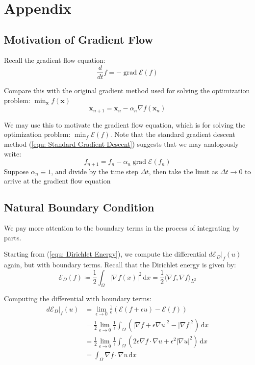 \documentclass[a4paper]{article}
\newcommand{\dx}{\, \text{d} x}
\theoremstyle{definition}
\DeclareMathOperator{\grad}{grad}
\begin{document}
\newpage
\section{Appendix}
\subsection{Motivation of Gradient Flow}
\label{sct: Motivation of Gradient Flow}
Recall the gradient flow equation:
\begin{equation}
    \frac{d}{dt}f = - \grad \mathcal{E}(f)
\end{equation}

Compare this with the original gradient method used for solving the optimization problem:
$\min_{\mathbf{x}} f(\mathbf{x})$
\begin{equation}
    \mathbf{x}_{n+1} = \mathbf{x}_n - \alpha_n \nabla f (\mathbf{x}_n)
    \label{equ: Standard Gradient Descent}
\end{equation}

We may use this to motivate the gradient flow equation, which is for solving the optimization problem:
$\min_f \mathcal{E} (f)$.
Note that the standard gradient descent method (\ref{equ: Standard Gradient Descent}) suggests that we may
analogously write:
\begin{equation}
    f_{n+1} = f_n - \alpha_n \grad \mathcal{E} (f_n)
\end{equation}
Suppose $\alpha_n \equiv 1$, and divide by the time step $\Delta t$, then take the limit as $\Delta t \rightarrow 0$ to arrive at the gradient flow equation


\subsection{Natural Boundary Condition}
\label{sct: Natural Boundary Condition}
We pay more attention to the boundary terms in the process of integrating by parts.

Starting from (\ref{equ: Dirichlet Energy}), we compute the differential $d \mathcal{E}_D |_f (u)$ again, but with boundary terms.
Recall that the Dirichlet energy is given by:
\begin{equation*}
    \mathcal{E}_D (f) \coloneqq \frac{1}{2} \int_{\Omega} |\nabla f(x)|^2 \dx = \frac{1}{2} \langle \nabla f, \nabla f \rangle_{L^2}
\end{equation*}

Computing the differential with boundary terms:
\begin{align}
    d \mathcal{E}_D|_f(u) &= \lim_{\epsilon \rightarrow 0}\frac{1}{\epsilon} \left( \mathcal{E}(f+\epsilon u) - \mathcal{E}(f) \right) \\
    &= \frac{1}{2} \lim_{\epsilon \rightarrow 0} \frac{1}{\epsilon} \int_{\Omega} \left( |\nabla f + \epsilon \nabla u|^2 - |\nabla f|^2 \right) \dx \\
    &= \frac{1}{2} \lim_{\epsilon \rightarrow 0} \frac{1}{\epsilon} \int_{\Omega} \left( 2\epsilon \nabla f \cdot \nabla u + \epsilon^2 |\nabla u|^2 \right) \dx \\
    &= \int_{\Omega} \nabla f \cdot \nabla u \dx
    \label{equ: Differential in Integral}
\end{align}
\end{document}
